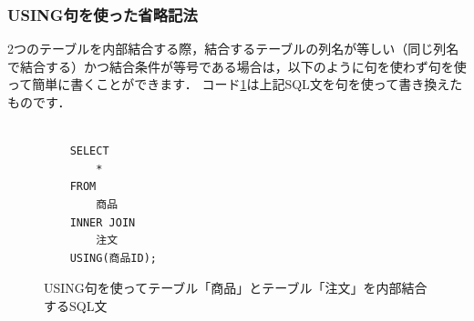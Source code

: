 \subsubsection{USING句を使った省略記法}
2つのテーブルを内部結合する際，結合するテーブルの列名が等しい（同じ列名で結合する）かつ結合条件が等号である場合は，以下のように句を使わず句を使って簡単に書くことができます．
コード\ref{code:sql-inner-join-using}は上記SQL文を句を使って書き換えたものです．
\begin{figure}[!htbp]
    \begin{verbatim}

    SELECT
        *
    FROM
        商品
    INNER JOIN
        注文
    USING(商品ID);

    \end{verbatim}
    \captionsetup{name=コード}
    \caption{USING句を使ってテーブル「商品」とテーブル「注文」を内部結合するSQL文}
    \label{code:sql-inner-join-using}
\end{figure}


